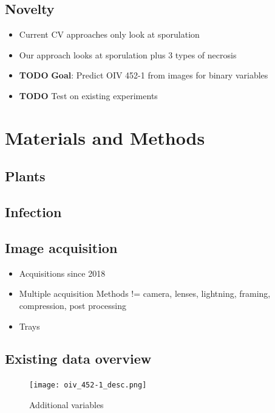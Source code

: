 \documentclass[english]{article}
\begin{document}
\subsection{Novelty}

\begin{itemize}
	\item Current CV approaches only look at sporulation
	\item Our approach looks at sporulation plus 3 types of necrosis
	\item \textbf{TODO} \textbf{Goal}: Predict OIV 452-1 from images for binary variables
	\item \textbf{TODO} Test on existing experiments
\end{itemize}

\section{Materials and Methods}

\subsection{Plants}

\parencite{bellinResistancePlasmoparaViticola2009}

\subsection{Infection}

\parencite{bellinResistancePlasmoparaViticola2009}

\subsection{Image acquisition}

\begin{itemize}
	\item Acquisitions since 2018
	\item Multiple acquisition Methods != camera, lenses, lightning, framing, compression, post processing
	\item Trays
\end{itemize}

\subsection{Existing data overview}

\begin{figure}
	\begin{center}
		\texttt{[image: oiv\_452-1\_desc.png]}
		\caption{Additional variables}\label{fig:newvariables}
	\end{center}
\end{figure}
\end{document}

